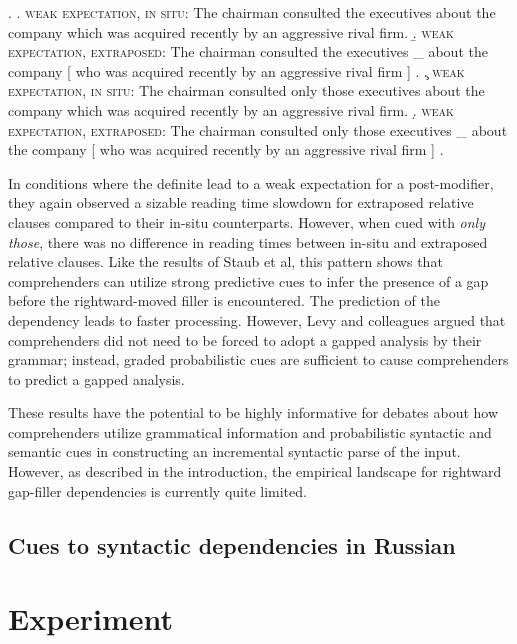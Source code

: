 \documentclass[12pt]{article}
\begin{document}
					\ex.	\label{levyonlythose}
					\a.	\textsc{weak expectation, in situ}: The chairman consulted the executives about the company which was acquired recently by an aggressive rival firm.
					\b.	\textsc{weak expectation, extraposed}: The chairman consulted the executives \_ about the company [ who was acquired recently by an aggressive rival firm ] .
					\c.	\textsc{weak expectation, in situ}: The chairman consulted only those executives about the company which was acquired recently by an aggressive rival firm.
					\d.	\textsc{weak expectation, extraposed}: The chairman consulted only those executives \_ about the company [ who was acquired recently by an aggressive rival firm ] .


	In conditions where the definite lead to a weak expectation for a post-modifier, they again observed a sizable reading time slowdown for extraposed relative clauses compared to their in-situ counterparts. However, when cued with \textit{only those}, there was no difference in reading times between in-situ and extraposed relative clauses. Like the results of Staub et al, this pattern shows that comprehenders can utilize strong predictive cues to infer the presence of a gap before the rightward-moved filler is encountered. The prediction of the dependency leads to faster processing. However, Levy and colleagues argued that comprehenders did not need to be forced to adopt a gapped analysis by their grammar; instead, graded probabilistic cues are sufficient to cause comprehenders to predict a gapped analysis.
	
	These results have the potential to be highly informative for debates about how comprehenders utilize grammatical information and probabilistic syntactic and semantic cues in constructing an incremental syntactic parse of the input. However, as described in the introduction, the empirical landscape for rightward gap-filler dependencies is currently quite limited. 
		
\subsection{Cues to syntactic dependencies in Russian}
	
	



\section{Experiment}
\label{sec:experiment}
\end{document}

